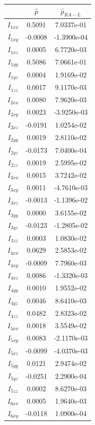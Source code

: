 \documentclass{article}
\begin{document}
\begin{table}
\begin{center}
\begin{tabular}{|c|cc|}
\hline
& $\hat{p}$ & $\hat{p}_{RA-L}$\\ 
\hline
$ I_{1xx} $ & 0.5091 & 7.0337e-01\\
$ I_{1xy} $ & -0.0008 & -1.3900e-04\\
$ I_{1xz} $ & 0.0005 & 6.7720e-03\\
$ I_{1yy} $ & 0.5086 & 7.0661e-01\\
$ I_{1yz} $ & 0.0004 & 1.9169e-02\\
$ I_{1zz} $ & 0.0017 & 9.1170e-03\\
$ I_{2xx} $ & 0.0080 & 7.9620e-03\\
$ I_{2xy} $ & 0.0023 & -3.9250e-03\\
$ I_{2xz} $ & -0.0191 & 1.0254e-02\\
$ I_{2yy} $ & 0.0019 & 2.8110e-02\\
$ I_{2yz} $ & -0.0173 & 7.0400e-04\\
$ I_{2zz} $ & 0.0019 & 2.5995e-02\\
$ I_{3xx} $ & 0.0015 & 3.7242e-02\\
$ I_{3xy} $ & 0.0011 & -4.7610e-03\\
$ I_{3xz} $ & -0.0013 & -1.1396e-02\\
$ I_{3yy} $ & 0.0000 & 3.6155e-02\\
$ I_{3yz} $ & -0.0123 & -1.2805e-02\\
$ I_{3zz} $ & 0.0003 & 1.0830e-02\\
$ I_{4xx} $ & 0.0629 & 2.5853e-02\\
$ I_{4xy} $ & -0.0009 & 7.7960e-03\\
$ I_{4xz} $ & 0.0086 & -1.3320e-03\\
$ I_{4yy} $ & 0.0010 & 1.9552e-02\\
$ I_{4yz} $ & 0.0046 & 8.6410e-03\\
$ I_{4zz} $ & 0.0482 & 2.8323e-02\\
$ I_{5xx} $ & 0.0018 & 3.5549e-02\\
$ I_{5xy} $ & 0.0083 & -2.1170e-03\\
$ I_{5xz} $ & -0.0099 & -4.0370e-03\\
$ I_{5yy} $ & 0.0121 & 2.9474e-02\\
$ I_{5yz} $ & -0.0251 & 2.2900e-04\\
$ I_{5zz} $ & 0.0002 & 8.6270e-03\\
$ I_{6xx} $ & 0.0005 & 1.9640e-03\\
$ I_{6xy} $ & -0.0118 & 1.0900e-04\\

\end{tabular}
\end{center}
\end{table}
\end{document}
